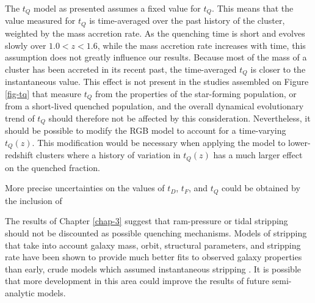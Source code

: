 
The $t_Q$ model as presented assumes a fixed value for $t_Q$.
This means that the value measured for $t_Q$ is time-averaged over the past history of the cluster, weighted by the mass accretion rate.
As the quenching time is short and evolves slowly over $1.0 < z < 1.6$, while the mass accretion rate increases with time, this assumption does not greatly influence our results.
Because most of the mass of a cluster has been accreted in its recent past, the time-averaged $t_Q$ is closer to the instantaneous value.
This effect is not present in the studies assembled on Figure \ref{fig-tq} that measure $t_Q$ from the properties of the star-forming population, or from a short-lived quenched population, and the overall dynamical evolutionary trend of $t_Q$ should therefore not be affected by this consideration.
Nevertheless, it should be possible to modify the RGB model to account for a time-varying $t_Q(z)$.
This modification would be necessary when applying the model to lower-redshift clusters where a history of variation in $t_Q(z)$ has a much larger effect on the quenched fraction.

More precise uncertainties on the values of $t_D$, $t_F$, and $t_Q$ could be obtained by the inclusion of

The results of Chapter \ref{chap-3} suggest that ram-pressure or tidal stripping should not be discounted as possible quenching mechanisms.
Models of stripping that take into account galaxy mass, orbit, structural parameters, and stripping rate have been shown to provide much better fits to observed galaxy properties than early, crude models which assumed instantaneous stripping \citep{McCarthy:2008aa,Font:2008ab,Henriques:2017aa}.
It is possible that more development in this area could improve the results of future semi-analytic models.


